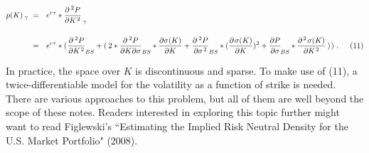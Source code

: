 \documentclass[12pt]{article}
\begin{document}
{\footnotesize
\begin{align*}
p(K)_{\hspace{2pt} \gamma}   \hspace{3pt} &= \hspace{7pt}   e^{r \tau} * \frac{\partial^{\hspace{2pt} 2} P}{\partial K^{\hspace{1pt} 2}}_{\hspace{2pt} \gamma}
\\[12pt]
\hspace{3pt} &= \hspace{7pt}   e^{r \tau} * (\hspace{1pt} \frac{\partial^{\hspace{2pt} 2} P}{\partial K^{\hspace{1pt} 2}}_{BS} + (\hspace{2pt} 2*\frac{\partial^{\hspace{2pt} 2} P}{\partial K \partial \sigma}_{BS} * \frac{\partial \sigma(K)}{\partial K} + \frac{\partial^{\hspace{2pt} 2} P}{\partial \sigma^{\hspace{1pt} 2}}_{BS} * (\frac{\partial \hspace{1pt} \sigma(K)}{\partial K})^{2} + \frac{\partial P}{\partial \sigma}_{\hspace{-1pt} BS} * \frac{\partial^{\hspace{1pt} 2} \hspace{1pt} \sigma(K)}{\partial K^{\hspace{1pt} 2}} \hspace{2pt}) \hspace{1pt}) \hspace{3pt}. \hspace{15pt} (11)
\end{align*}
}

\vspace{-15pt}

\begin{paragraph}
\indent In practice, the space over $K$ is discontinuous and sparse. To make use of (11), a twice-differentiable model for the volatility as a function of strike is needed. There are various approaches to this problem, but all of them are well beyond the scope of these notes. Readers interested in exploring this topic further might want to read Figlewski's ``Estimating the Implied Risk Neutral Density for the U.S. Market Portfolio" (2008).
\end{paragraph}
\end{document}
